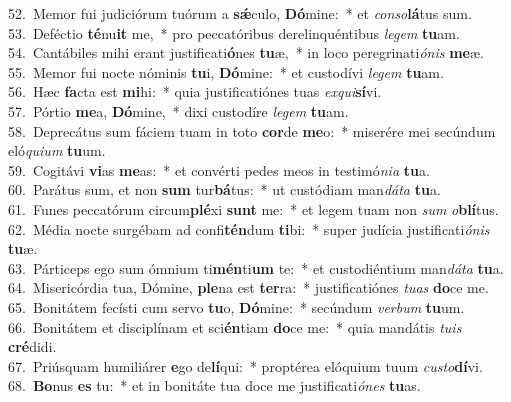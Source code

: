 {52.~}Memor fui judiciórum tuórum a \textbf{sǽ}culo, \textbf{Dó}mine:~* et \textit{con}\textit{so}\textbf{lá}tus sum.\\
{53.~}Deféctio \textbf{té}nu\textbf{it} me,~* pro peccatóribus derelinquéntibus \textit{le}\textit{gem} \textbf{tu}am.\\
{54.~}Cantábiles mihi erant justificati\textbf{ó}nes \textbf{tu}æ,~* in loco peregrinati\textit{ó}\textit{nis} \textbf{me}æ.\\
{55.~}Memor fui nocte nóminis \textbf{tu}i, \textbf{Dó}mine:~* et custodívi \textit{le}\textit{gem} \textbf{tu}am.\\
{56.~}Hæc \textbf{fa}cta est \textbf{mi}hi:~* quia justificatiónes tuas \textit{ex}\textit{qui}\textbf{sí}vi.\\
{57.~}Pórtio \textbf{me}a, \textbf{Dó}mine,~* dixi custodíre \textit{le}\textit{gem} \textbf{tu}am.\\
{58.~}Deprecátus sum fáciem tuam in toto \textbf{cor}de \textbf{me}o:~* miserére mei secúndum eló\textit{qui}\textit{um} \textbf{tu}um.\\
{59.~}Cogitávi \textbf{vi}as \textbf{me}as:~* et convérti pedes meos in testimó\textit{ni}\textit{a} \textbf{tu}a.\\
{60.~}Parátus sum, et non \textbf{sum} tur\textbf{bá}tus:~* ut custódiam man\textit{dá}\textit{ta} \textbf{tu}a.\\
{61.~}Funes peccatórum circum\textbf{plé}xi \textbf{sunt} me:~* et legem tuam non \textit{sum} \textit{o}\textbf{blí}tus.\\
{62.~}Média nocte surgébam ad confi\textbf{tén}dum \textbf{ti}bi:~* super judícia justificati\textit{ó}\textit{nis} \textbf{tu}æ.\\
{63.~}Párticeps ego sum ómnium ti\textbf{mén}ti\textbf{um} te:~* et custodiéntium man\textit{dá}\textit{ta} \textbf{tu}a.\\
{64.~}Misericórdia tua, Dómine, \textbf{ple}na est \textbf{ter}ra:~* justificatiónes \textit{tu}\textit{as} \textbf{do}ce me.\\
{65.~}Bonitátem fecísti cum servo \textbf{tu}o, \textbf{Dó}mine:~* secúndum \textit{ver}\textit{bum} \textbf{tu}um.\\
{66.~}Bonitátem et disciplínam et sci\textbf{én}tiam \textbf{do}ce me:~* quia mandátis \textit{tu}\textit{is} \textbf{cré}didi.\\
{67.~}Priúsquam humiliárer \textbf{e}go de\textbf{lí}qui:~* proptérea elóquium tuum \textit{cu}\textit{sto}\textbf{dí}vi.\\
{68.~}\textbf{Bo}nus \textbf{es} tu:~* et in bonitáte tua doce me justificati\textit{ó}\textit{nes} \textbf{tu}as.\\
